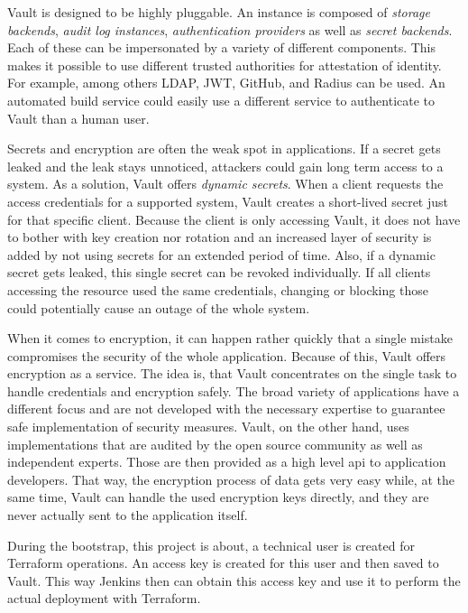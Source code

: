 Vault is designed to be highly pluggable.
An instance is composed of \emph{storage backends}, \emph{audit log instances}, \emph{authentication providers} as well as \emph{secret backends}.
Each of these can be impersonated by a variety of different components.
This makes it possible to use different trusted authorities for attestation of identity.
For example, among others LDAP, JWT, GitHub, and Radius can be used.
An automated build service could easily use a different service to authenticate to Vault than a human user.

Secrets and encryption are often the weak spot in applications.
If a secret gets leaked and the leak stays unnoticed, attackers could gain long term access to a system.
As a solution, Vault offers \emph{dynamic secrets}.
When a client requests the access credentials for a supported system, Vault creates a short-lived secret just for that specific client.
Because the client is only accessing Vault, it does not have to bother with key creation nor rotation and an increased layer of security is added by not using secrets for an extended period of time.
Also, if a dynamic secret gets leaked, this single secret can be revoked individually.
If all clients accessing the resource used the same credentials, changing or blocking those could potentially cause an outage of the whole system.

When it comes to encryption, it can happen rather quickly that a single mistake compromises the security of the whole application.
Because of this, Vault offers encryption as a service.
The idea is, that Vault concentrates on the single task to handle credentials and encryption safely.
The broad variety of applications have a different focus and are not developed with the necessary expertise to guarantee safe implementation of security measures.
Vault, on the other hand, uses implementations that are audited by the open source community as well as independent experts.
Those are then provided as a high level \ac{api} to application developers.
That way, the encryption process of data gets very easy while, at the same time, Vault can handle the used encryption keys directly, and they are never actually sent to the application itself. \cite{vaultproject.io}

During the bootstrap, this project is about, a technical user is created for Terraform operations.
An access key is created for this user and then saved to Vault.
This way Jenkins then can obtain this access key and use it to perform the actual deployment with Terraform.


